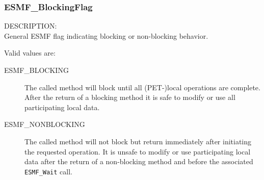
\subsubsection{ESMF\_BlockingFlag}

{\sf DESCRIPTION:\\}
General ESMF flag indicating blocking or non-blocking behavior.

Valid values are:
\begin{description}
   \item [ESMF\_BLOCKING]
         The called method will block until all (PET-)local operations are 
         complete. After the return of a blocking method it is safe to modify
         or use all participating local data.
   \item [ESMF\_NONBLOCKING]
         The called method will not block but return immediately after
         initiating the requested operation. It is unsafe to modify
         or use participating local data after the return of a non-blocking
         method and before the associated {\tt ESMF\_Wait} call.
\end{description}
